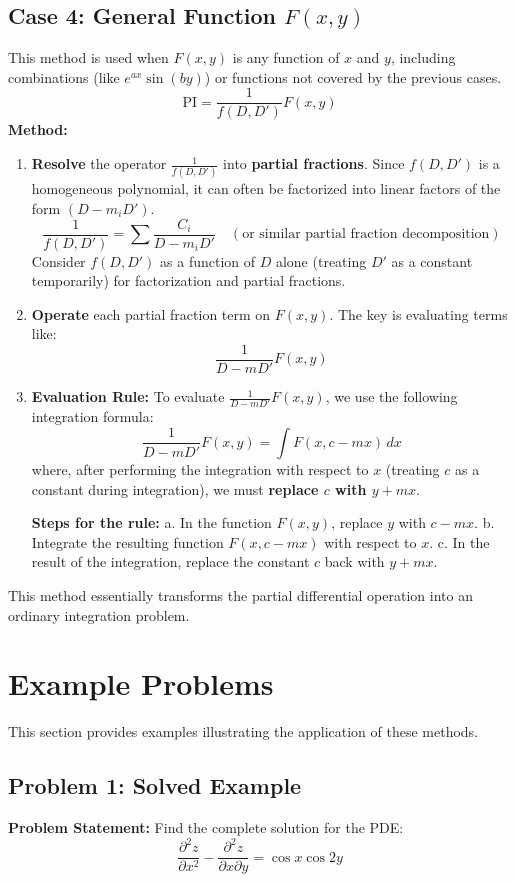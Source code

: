 \documentclass{article}
\theoremstyle{remark}
\begin{document}
	\subsection{Case 4: General Function $F(x, y)$}
	This method is used when $F(x, y)$ is any function of $x$ and $y$, including combinations (like $e^{ax} \sin(by)$) or functions not covered by the previous cases.
	\[
	\text{PI} = \frac{1}{f(D, D')} F(x, y)
	\]
	\textbf{Method:}
	\begin{enumerate}
		\item \textbf{Resolve} the operator $\frac{1}{f(D, D')}$ into \textbf{partial fractions}. Since $f(D, D')$ is a homogeneous polynomial, it can often be factorized into linear factors of the form $(D - m_i D')$.
		\[
		\frac{1}{f(D, D')} = \sum \frac{C_i}{D - m_i D'} \quad (\text{or similar partial fraction decomposition})
		\]
		Consider $f(D, D')$ as a function of $D$ alone (treating $D'$ as a constant temporarily) for factorization and partial fractions.
		\item \textbf{Operate} each partial fraction term on $F(x, y)$. The key is evaluating terms like:
		\[
		\frac{1}{D - m D'} F(x, y)
		\]
		\item \textbf{Evaluation Rule:} To evaluate $\frac{1}{D - m D'} F(x, y)$, we use the following integration formula:
		\[
		\frac{1}{D - m D'} F(x, y) = \int F(x, c - mx) \, dx
		\]
		where, after performing the integration with respect to $x$ (treating $c$ as a constant during integration), we must \textbf{replace $c$ with $y + mx$}.
		
		\textbf{Steps for the rule:}
		a. In the function $F(x, y)$, replace $y$ with $c - mx$.
		b. Integrate the resulting function $F(x, c - mx)$ with respect to $x$.
		c. In the result of the integration, replace the constant $c$ back with $y + mx$.
	\end{enumerate}
	This method essentially transforms the partial differential operation into an ordinary integration problem.
	
	\section{Example Problems}
	
	This section provides examples illustrating the application of these methods.
	
	\subsection{Problem 1: Solved Example}
	\textbf{Problem Statement:} Find the complete solution for the PDE:
	\[
	\frac{\partial^2 z}{\partial x^2} - \frac{\partial^2 z}{\partial x \partial y} = \cos x \cos 2y
	\]
	
\end{document}
